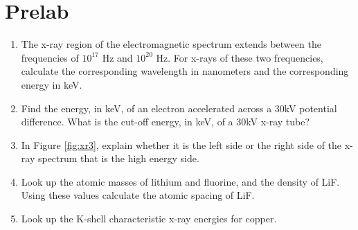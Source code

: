 \section{Prelab}
\begin{enumerate}
\item The x-ray region of the electromagnetic spectrum extends between the frequencies of $10^{17}$ Hz and $10^{20}$ Hz. For x-rays of these two frequencies, calculate the corresponding wavelength in nanometers and the corresponding energy in keV.

\item Find the energy, in keV, of an electron accelerated across a 30kV potential difference. What is the cut-off energy, in keV, of a 30kV x-ray tube?

\item In Figure \ref{fig:xr3}, explain whether it is the left side or the right side of the x-ray spectrum that is the high energy side.

\item Look up the atomic masses of lithium and fluorine, and the density of LiF. Using these values calculate the atomic spacing of LiF.

\item Look up the K-shell characteristic x-ray energies for copper.


\end{enumerate}

